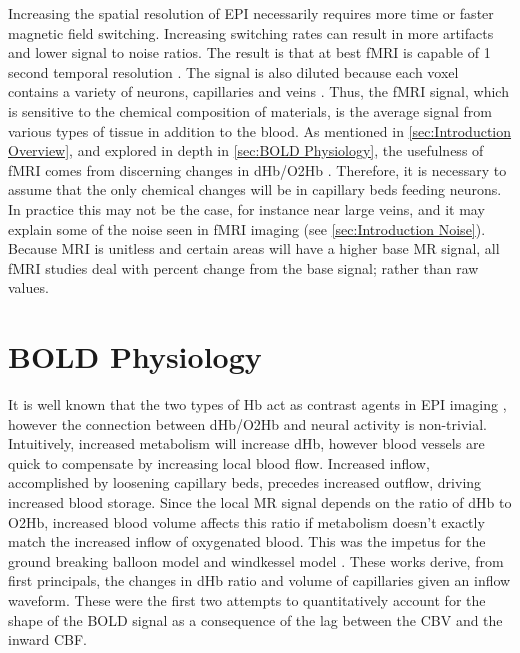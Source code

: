 Increasing the spatial resolution of \ac{EPI} necessarily 
requires more time or faster magnetic field switching. Increasing
switching rates can result in
more artifacts and lower signal to noise ratios. The result is
that at best \ac{fMRI} is capable of 1 second temporal resolution
\cite{Ladd2010, Poser2010}. 
The signal is also diluted because each voxel contains
a variety of neurons, capillaries and veins \cite{Obata2004}. 
Thus, the \ac{fMRI} signal, which is sensitive to the chemical composition of 
materials, is the average signal from various types of tissue
in addition to the blood. As mentioned in \autoref{sec:Introduction Overview},
and explored in depth in \autoref{sec:BOLD Physiology},
the usefulness of \ac{fMRI} comes from discerning changes in 
\ac{dHb}/\ac{O2Hb} \cite{Ogawa, Obata2004}. Therefore, it is necessary to assume
that the only chemical changes will be in
capillary beds feeding neurons. In practice this may not be the case, for
instance near large veins, and it may explain some of the
noise seen in \ac{fMRI} imaging (see \autoref{sec:Introduction Noise}). 
Because \ac{MRI} is unitless and certain
areas will have a higher base \ac{MR} signal, all \ac{fMRI} studies deal with
percent change from the base signal; rather than raw values. 

\section{BOLD Physiology}
\label{sec:BOLD Physiology}
It is well known that the two types of \ac{Hb} act as contrast agents in 
\ac{EPI} imaging \cite{Buxton1998, WEISSKOFF1994, Ogawa}, however the connection
between \ac{dHb}/\ac{O2Hb} and neural activity is non-trivial. 
Intuitively, increased 
metabolism will increase \ac{dHb}, however blood vessels are quick
to compensate by increasing local blood flow. Increased inflow, accomplished by loosening 
capillary beds, precedes increased outflow, driving increased 
blood storage.
Since the local \ac{MR} signal depends on the ratio of \ac{dHb} to \ac{O2Hb},
increased blood volume affects this ratio if 
metabolism doesn't exactly match the increased inflow of oxygenated blood.
This was the impetus
for the ground breaking balloon model \cite{Buxton1998} and windkessel
model \cite{Mandeville1999}. These works derive, from first principals,
the changes in \ac{dHb} ratio and volume of capillaries given an inflow waveform.
These were the first two attempts to quantitatively account for the shape of the 
\ac{BOLD} signal as a consequence of the lag between the \ac{CBV}
and the inward \ac{CBF}. 

